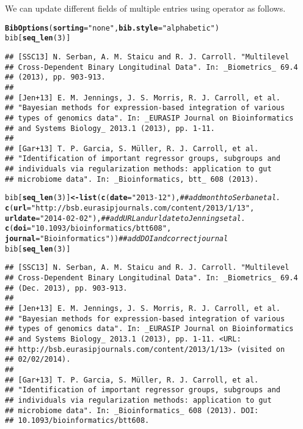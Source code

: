 \documentclass[article]{jss}\usepackage[]{graphicx}\usepackage[]{color}
\makeatletter
\newcommand{\hlnum}[1]{\textcolor[rgb]{0.125,0.125,1}{#1}}%
\newcommand{\hlstr}[1]{\textcolor[rgb]{0.125,0.125,1}{#1}}%
\newcommand{\hlcom}[1]{\textcolor[rgb]{1,0,0.753}{\textit{#1}}}%
\newcommand{\hlstd}[1]{\textcolor[rgb]{0.251,0.251,0.282}{#1}}%
\newcommand{\hlkwb}[1]{\textcolor[rgb]{0.439,0.251,1}{\textbf{#1}}}%
\newcommand{\hlkwc}[1]{\textcolor[rgb]{0.529,0,0.184}{\textbf{#1}}}%
\newcommand{\hlkwd}[1]{\textcolor[rgb]{0.251,0.251,0.282}{\textbf{#1}}}%
\newenvironment{kframe}{%
 \def\at@end@of@kframe{}%
 \ifinner\ifhmode%
  \def\at@end@of@kframe{\end{minipage}}%
  \begin{minipage}{\columnwidth}%
 \fi\fi%
 \def\FrameCommand##1{\hskip\@totalleftmargin \hskip-\fboxsep
 \colorbox{shadecolor}{##1}\hskip-\fboxsep
     \hskip-\linewidth \hskip-\@totalleftmargin \hskip\columnwidth}%
 \MakeFramed {\advance\hsize-\width
   \@totalleftmargin\z@ \linewidth\hsize
   \@setminipage}}%
 {\par\unskip\endMakeFramed%
 \at@end@of@kframe}
\newenvironment{knitrout}{}{} %
\makeatother
\begin{document}
We can update different fields of multiple entries using operator \code{[<-} as follows.
\begin{knitrout}
\color{fgcolor}\begin{kframe}
\begin{alltt}
\hlkwd{BibOptions}\hlstd{(}\hlkwc{sorting} \hlstd{=} \hlstr{"none"}\hlstd{,} \hlkwc{bib.style} \hlstd{=} \hlstr{"alphabetic"}\hlstd{)}
\hlstd{bib[}\hlkwd{seq_len}\hlstd{(}\hlnum{3}\hlstd{)]}
\end{alltt}
\begin{verbatim}
## [SSC13] N. Serban, A. M. Staicu and R. J. Carroll. "Multilevel
## Cross-Dependent Binary Longitudinal Data". In: _Biometrics_ 69.4
## (2013), pp. 903-913.
## 
## [Jen+13] E. M. Jennings, J. S. Morris, R. J. Carroll, et al.
## "Bayesian methods for expression-based integration of various
## types of genomics data". In: _EURASIP Journal on Bioinformatics
## and Systems Biology_ 2013.1 (2013), pp. 1-11.
## 
## [Gar+13] T. P. Garcia, S. Müller, R. J. Carroll, et al.
## "Identification of important regressor groups, subgroups and
## individuals via regularization methods: application to gut
## microbiome data". In: _Bioinformatics, btt_ 608 (2013).
\end{verbatim}
\begin{alltt}
\hlstd{bib[}\hlkwd{seq_len}\hlstd{(}\hlnum{3}\hlstd{)]} \hlkwb{<-} \hlkwd{list}\hlstd{(}\hlkwd{c}\hlstd{(}\hlkwc{date}\hlstd{=}\hlstr{"2013-12"}\hlstd{),} \hlcom{## add month to Serban et al.}
        \hlkwd{c}\hlstd{(}\hlkwc{url}\hlstd{=}\hlstr{"http://bsb.eurasipjournals.com/content/2013/1/13"}\hlstd{,}
          \hlkwc{urldate} \hlstd{=} \hlstr{"2014-02-02"}\hlstd{),} \hlcom{## add URL and urldate to Jennings et al.}
        \hlkwd{c}\hlstd{(}\hlkwc{doi}\hlstd{=}\hlstr{"10.1093/bioinformatics/btt608"}\hlstd{,}
          \hlkwc{journal} \hlstd{=} \hlstr{"Bioinformatics"}\hlstd{))} \hlcom{## add DOI and correct journal}
\hlstd{bib[}\hlkwd{seq_len}\hlstd{(}\hlnum{3}\hlstd{)]}
\end{alltt}
\begin{verbatim}
## [SSC13] N. Serban, A. M. Staicu and R. J. Carroll. "Multilevel
## Cross-Dependent Binary Longitudinal Data". In: _Biometrics_ 69.4
## (Dec. 2013), pp. 903-913.
## 
## [Jen+13] E. M. Jennings, J. S. Morris, R. J. Carroll, et al.
## "Bayesian methods for expression-based integration of various
## types of genomics data". In: _EURASIP Journal on Bioinformatics
## and Systems Biology_ 2013.1 (2013), pp. 1-11. <URL:
## http://bsb.eurasipjournals.com/content/2013/1/13> (visited on
## 02/02/2014).
## 
## [Gar+13] T. P. Garcia, S. Müller, R. J. Carroll, et al.
## "Identification of important regressor groups, subgroups and
## individuals via regularization methods: application to gut
## microbiome data". In: _Bioinformatics_ 608 (2013). DOI:
## 10.1093/bioinformatics/btt608.
\end{verbatim}
\end{kframe}
\end{knitrout}
\end{document}
